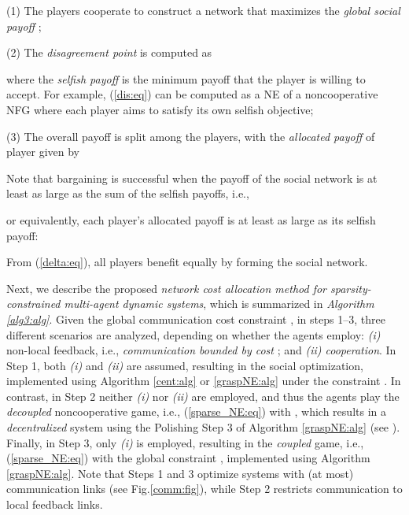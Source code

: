 \documentclass[12pt, draftclsnofoot,onecolumn]{IEEEtran}
\begin{document}
(1) The players cooperate to construct a network that maximizes the {\it global social payoff} ; 

(2) The {\it disagreement point} is computed as

\noindent where the {\it selfish payoff}  is the minimum payoff that the  player is willing to accept. For example, (\ref{dis:eq}) can be computed as a NE of a noncooperative NFG where each player aims to satisfy its own selfish objective; 

(3) The overall payoff  is split among the players, with the {\it allocated payoff} of player  given by \cite{kawamori2016nash}
	

\noindent Note that bargaining is successful when the payoff of the social network is at least as large as the sum of the selfish payoffs, i.e.,

\noindent or equivalently, each player's allocated payoff is at least as large as its selfish payoff:

\noindent From (\ref{delta:eq}), all players benefit equally by forming the social network.

Next, we describe the proposed {\it network cost allocation method for sparsity-constrained multi-agent dynamic systems}, which is summarized in {\it Algorithm \ref{alg3:alg}}. Given the global communication cost constraint , in steps 1--3, three different scenarios are analyzed, depending on whether the agents employ: {\it (i)} non-local feedback, i.e., {\it communication bounded by cost }; and {\it (ii) cooperation}. In Step 1, both {\it(i)} and {\it(ii)} are assumed, resulting in the social optimization, implemented using Algorithm \ref{cent:alg} or \ref{graspNE:alg} under the constraint . In contrast, in Step 2 neither {\it (i)} nor {\it (ii)} are employed, and thus the agents play the {\it decoupled} noncooperative game, i.e., (\ref{sparse_NE:eq}) with , which results in a {\it decentralized} system using the Polishing Step 3 of Algorithm \ref{graspNE:alg} (see \cite{lianensuring}). Finally, in Step 3, only {\it (i)} is employed, resulting in the {\it coupled} game, i.e., (\ref{sparse_NE:eq}) with the global constraint , implemented using Algorithm \ref{graspNE:alg}. Note that Steps 1 and 3 optimize systems with (at most)  communication links (see Fig.\ref{comm:fig}), while Step 2 restricts communication to local feedback links.  
\end{document}
